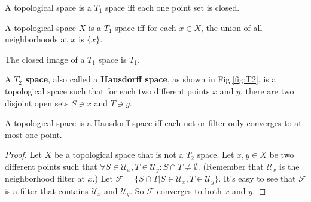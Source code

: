 \documentclass[12pt]{book}
\begin{document}
	\begin{definition}
		A topological space is a $T_1$ space iff each one point set is closed.
	\end{definition}
	
	\begin{definition}
		A topological space $X$ is a $T_1$ space iff for each $x\in X$, the union of all neighborhoods at $x$ is $\{x\}$.
	\end{definition}
	
	\begin{theorem}
		The closed image of a $T_1$ space is $T_1$.
	\end{theorem}
	
	\begin{definition}
		A {\bf $T_2$ space}, also called a {\bf Hausdorff space}, as shown in Fig.\ref{fig:T2}, is a topological space such that for each two different points $x$ and $y$, there are two disjoint open sets $S\ni x$ and $T\ni y$.
	\end{definition}
	
	\begin{theorem}
		A topological space is a Hausdorff space iff each net or filter only converges to at most one point.
	\end{theorem}
	
	\begin{proof}
		Let $X$ be a topological space that is not a $T_2$ space. Let $x,y\in X$ be two different points such that $\forall S\in \mathcal U_x,T\in \mathcal U_y:S\cap T\neq\emptyset$. (Remember that $\mathcal U_x$ is the neighborhood filter at $x$.) Let $\mathcal F=\{S\cap T|S\in \mathcal U_x,T\in \mathcal U_y\}$. It's easy to see that $\mathcal F$ is a filter that contains $\mathcal U_x$ and $\mathcal U_y$. So $\mathcal F$ converges to both $x$ and $y$.
	\end{proof}
	
\end{document}
